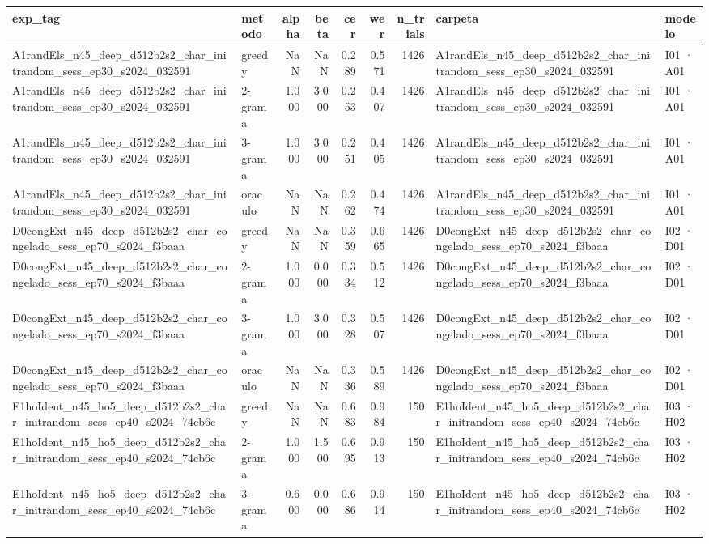 \begin{tabular}{llrrrrrll}
\toprule
exp_tag & metodo & alpha & beta & cer & wer & n_trials & carpeta & modelo \\
\midrule
A1randEls_n45_deep_d512b2s2_char_initrandom_sess_ep30_s2024_032591 & greedy & NaN & NaN & 0.289 & 0.571 & 1426 & A1randEls_n45_deep_d512b2s2_char_initrandom_sess_ep30_s2024_032591 & I01 · A01 \\
A1randEls_n45_deep_d512b2s2_char_initrandom_sess_ep30_s2024_032591 & 2-grama & 1.000 & 3.000 & 0.253 & 0.407 & 1426 & A1randEls_n45_deep_d512b2s2_char_initrandom_sess_ep30_s2024_032591 & I01 · A01 \\
A1randEls_n45_deep_d512b2s2_char_initrandom_sess_ep30_s2024_032591 & 3-grama & 1.000 & 3.000 & 0.251 & 0.405 & 1426 & A1randEls_n45_deep_d512b2s2_char_initrandom_sess_ep30_s2024_032591 & I01 · A01 \\
A1randEls_n45_deep_d512b2s2_char_initrandom_sess_ep30_s2024_032591 & oraculo & NaN & NaN & 0.262 & 0.474 & 1426 & A1randEls_n45_deep_d512b2s2_char_initrandom_sess_ep30_s2024_032591 & I01 · A01 \\
D0congExt_n45_deep_d512b2s2_char_congelado_sess_ep70_s2024_f3baaa & greedy & NaN & NaN & 0.359 & 0.665 & 1426 & D0congExt_n45_deep_d512b2s2_char_congelado_sess_ep70_s2024_f3baaa & I02 · D01 \\
D0congExt_n45_deep_d512b2s2_char_congelado_sess_ep70_s2024_f3baaa & 2-grama & 1.000 & 0.000 & 0.334 & 0.512 & 1426 & D0congExt_n45_deep_d512b2s2_char_congelado_sess_ep70_s2024_f3baaa & I02 · D01 \\
D0congExt_n45_deep_d512b2s2_char_congelado_sess_ep70_s2024_f3baaa & 3-grama & 1.000 & 3.000 & 0.328 & 0.507 & 1426 & D0congExt_n45_deep_d512b2s2_char_congelado_sess_ep70_s2024_f3baaa & I02 · D01 \\
D0congExt_n45_deep_d512b2s2_char_congelado_sess_ep70_s2024_f3baaa & oraculo & NaN & NaN & 0.336 & 0.589 & 1426 & D0congExt_n45_deep_d512b2s2_char_congelado_sess_ep70_s2024_f3baaa & I02 · D01 \\
E1hoIdent_n45_ho5_deep_d512b2s2_char_initrandom_sess_ep40_s2024_74cb6c & greedy & NaN & NaN & 0.683 & 0.984 & 150 & E1hoIdent_n45_ho5_deep_d512b2s2_char_initrandom_sess_ep40_s2024_74cb6c & I03 · H02 \\
E1hoIdent_n45_ho5_deep_d512b2s2_char_initrandom_sess_ep40_s2024_74cb6c & 2-grama & 1.000 & 1.500 & 0.695 & 0.913 & 150 & E1hoIdent_n45_ho5_deep_d512b2s2_char_initrandom_sess_ep40_s2024_74cb6c & I03 · H02 \\
E1hoIdent_n45_ho5_deep_d512b2s2_char_initrandom_sess_ep40_s2024_74cb6c & 3-grama & 0.600 & 0.000 & 0.686 & 0.914 & 150 & E1hoIdent_n45_ho5_deep_d512b2s2_char_initrandom_sess_ep40_s2024_74cb6c & I03 · H02 \\

\end{tabular}
